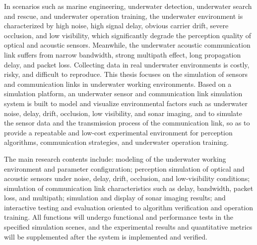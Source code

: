\begin{abstracten}

In scenarios such as marine engineering, underwater detection, underwater search and rescue, and underwater operation training, the underwater environment is characterized by high noise, high signal delay, obvious carrier drift, severe occlusion, and low visibility, which significantly degrade the perception quality of optical and acoustic sensors. Meanwhile, the underwater acoustic communication link suffers from narrow bandwidth, strong multipath effect, long propagation delay, and packet loss. Collecting data in real underwater environments is costly, risky, and difficult to reproduce. This thesis focuses on the simulation of sensors and communication links in underwater working environments. Based on a simulation platform, an underwater sensor and communication link simulation system is built to model and visualize environmental factors such as underwater noise, delay, drift, occlusion, low visibility, and sonar imaging, and to simulate the sensor data and the transmission process of the communication link, so as to provide a repeatable and low-cost experimental environment for perception algorithms, communication strategies, and underwater operation training.

The main research contents include: modeling of the underwater working environment and parameter configuration; perception simulation of optical and acoustic sensors under noise, delay, drift, occlusion, and low-visibility conditions; simulation of communication link characteristics such as delay, bandwidth, packet loss, and multipath; simulation and display of sonar imaging results; and interactive testing and evaluation oriented to algorithm verification and operation training. All functions will undergo functional and performance tests in the specified simulation scenes, and the experimental results and quantitative metrics will be supplemented after the system is implemented and verified.

\end{abstracten}
